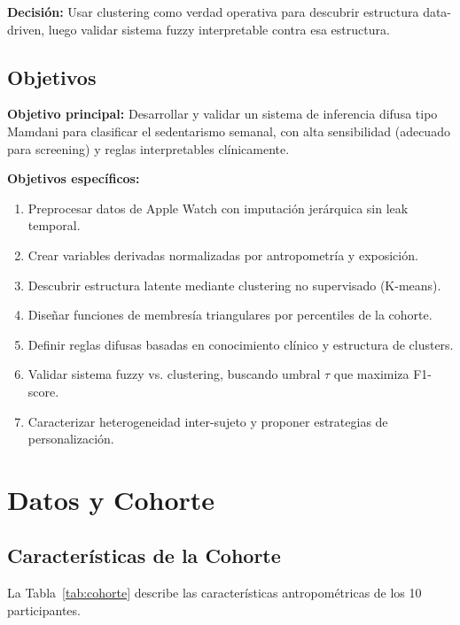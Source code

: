 \documentclass[12pt,a4paper,twoside]{article}
\begin{document}
\textbf{Decisión:} Usar clustering como verdad operativa para descubrir estructura data-driven, luego validar sistema fuzzy interpretable contra esa estructura.

\subsection{Objetivos}

\textbf{Objetivo principal:} Desarrollar y validar un sistema de inferencia difusa tipo Mamdani para clasificar el sedentarismo semanal, con alta sensibilidad (adecuado para screening) y reglas interpretables clínicamente.

\textbf{Objetivos específicos:}
\begin{enumerate}
    \item Preprocesar datos de Apple Watch con imputación jerárquica sin leak temporal.
    \item Crear variables derivadas normalizadas por antropometría y exposición.
    \item Descubrir estructura latente mediante clustering no supervisado (K-means).
    \item Diseñar funciones de membresía triangulares por percentiles de la cohorte.
    \item Definir reglas difusas basadas en conocimiento clínico y estructura de clusters.
    \item Validar sistema fuzzy vs. clustering, buscando umbral $\tau$ que maximiza F1-score.
    \item Caracterizar heterogeneidad inter-sujeto y proponer estrategias de personalización.
\end{enumerate}


\section{Datos y Cohorte}

\subsection{Características de la Cohorte}

La Tabla~\ref{tab:cohorte} describe las características antropométricas de los 10 participantes.
\end{document}
